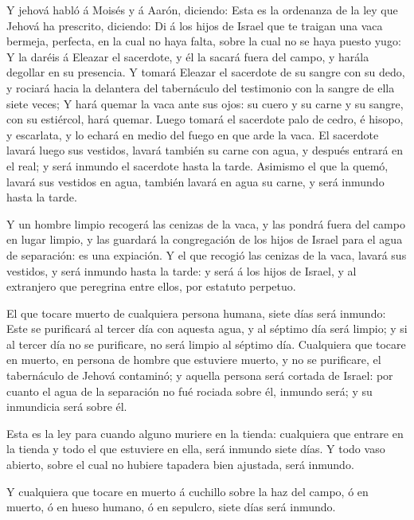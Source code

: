  Y jehová habló á Moisés y á Aarón, diciendo: 
Esta es la ordenanza de la ley que Jehová ha prescrito, diciendo: Di á
los hijos de Israel que te traigan una vaca bermeja, perfecta, en la
cual no haya falta, sobre la cual no se haya puesto yugo:  Y
la daréis á Eleazar el sacerdote, y él la sacará fuera del campo, y
harála degollar en su presencia.  Y tomará Eleazar el
sacerdote de su sangre con su dedo, y rociará hacia la delantera del
tabernáculo del testimonio con la sangre de ella siete veces;
 Y hará quemar la vaca ante sus ojos: su cuero y su carne y
su sangre, con su estiércol, hará quemar.  Luego tomará el
sacerdote palo de cedro, é hisopo, y escarlata, y lo echará en medio del
fuego en que arde la vaca.  El sacerdote lavará luego sus
vestidos, lavará también su carne con agua, y después entrará en el
real; y será inmundo el sacerdote hasta la tarde.  Asimismo
el que la quemó, lavará sus vestidos en agua, también lavará en agua su
carne, y será inmundo hasta la tarde.

 Y un hombre limpio recogerá las cenizas de la vaca, y las
pondrá fuera del campo en lugar limpio, y las guardará la congregación
de los hijos de Israel para el agua de separación: es una expiación.
 Y el que recogió las cenizas de la vaca, lavará sus
vestidos, y será inmundo hasta la tarde: y será á los hijos de Israel, y
al extranjero que peregrina entre ellos, por estatuto perpetuo.

 El que tocare muerto de cualquiera persona humana, siete
días será inmundo:  Este se purificará al tercer día con
aquesta agua, y al séptimo día será limpio; y si al tercer día no se
purificare, no será limpio al séptimo día.  Cualquiera que
tocare en muerto, en persona de hombre que estuviere muerto, y no se
purificare, el tabernáculo de Jehová contaminó; y aquella persona será
cortada de Israel: por cuanto el agua de la separación no fué rociada
sobre él, inmundo será; y su inmundicia será sobre él.

 Esta es la ley para cuando alguno muriere en la tienda:
cualquiera que entrare en la tienda y todo el que estuviere en ella,
será inmundo siete días.  Y todo vaso abierto, sobre el
cual no hubiere tapadera bien ajustada, será inmundo.

 Y cualquiera que tocare en muerto á cuchillo sobre la haz
del campo, ó en muerto, ó en hueso humano, ó en sepulcro, siete días
será inmundo.

